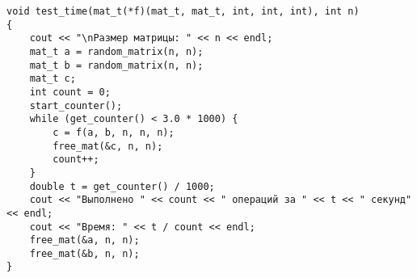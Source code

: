 \begin{lstlisting}[caption = Функция замера процессорного времени работы функции]
void test_time(mat_t(*f)(mat_t, mat_t, int, int, int), int n)
{
	cout << "\nРазмер матрицы: " << n << endl;
	mat_t a = random_matrix(n, n);
	mat_t b = random_matrix(n, n);
	mat_t c;
	int count = 0;
	start_counter();
	while (get_counter() < 3.0 * 1000) {
		c = f(a, b, n, n, n);
		free_mat(&c, n, n);
		count++;
	}
	double t = get_counter() / 1000;
	cout << "Выполнено " << count << " операций за " << t << " секунд" << endl;
	cout << "Время: " << t / count << endl;
	free_mat(&a, n, n);
	free_mat(&b, n, n);
}
\end{lstlisting}

